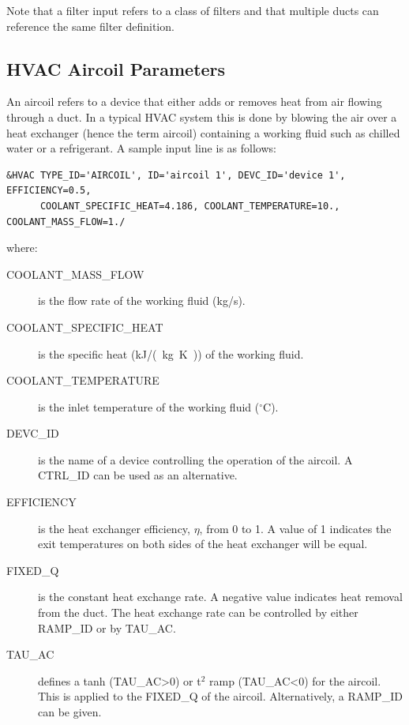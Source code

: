 \documentclass[11pt]{book}
\begin{document}
Note that a filter input refers to a class of filters and that multiple ducts can reference the same filter definition.

\subsection{HVAC Aircoil Parameters}
\label{info:HVACaircoil}

An aircoil refers to a device that either adds or removes heat from air flowing through a duct.  In a typical HVAC system this is done by blowing the air over a heat exchanger (hence the term aircoil) containing a working fluid such as chilled water or a refrigerant.  A sample input line is as follows:

\begin{lstlisting}
&HVAC TYPE_ID='AIRCOIL', ID='aircoil 1', DEVC_ID='device 1', EFFICIENCY=0.5,
      COOLANT_SPECIFIC_HEAT=4.186, COOLANT_TEMPERATURE=10., COOLANT_MASS_FLOW=1./
\end{lstlisting}

\noindent where:

\begin{description}
\item[{\ct COOLANT\_MASS\_FLOW}] is the flow rate of the working fluid (kg/s).
\item[{\ct COOLANT\_SPECIFIC\_HEAT}] is the specific heat (\si{kJ/(kg.K)}) of the working fluid.
\item[{\ct COOLANT\_TEMPERATURE}] is the inlet temperature of the working fluid ($^\circ$C).
\item[{\ct DEVC\_ID}] is the name of a device controlling the operation of the aircoil. A {\ct CTRL\_ID} can be used as an alternative.
\item[{\ct EFFICIENCY}] is the heat exchanger efficiency, $\eta$, from 0 to 1.  A value of 1 indicates the exit temperatures on both sides of the heat exchanger will be equal.
\item[{\ct FIXED\_Q}] is the constant heat exchange rate. A negative value indicates heat removal from the duct.  The heat exchange rate can be controlled by either {\ct RAMP\_ID} or by {\ct TAU\_AC}.
\item[{\ct TAU\_AC}]  defines a tanh ({\ct TAU\_AC}>0) or t$^2$ ramp ({\ct TAU\_AC}<0) for the aircoil.  This is applied to the {\ct FIXED\_Q} of the aircoil. Alternatively, a {\ct RAMP\_ID} can be given.
\end{description}
\end{document}
